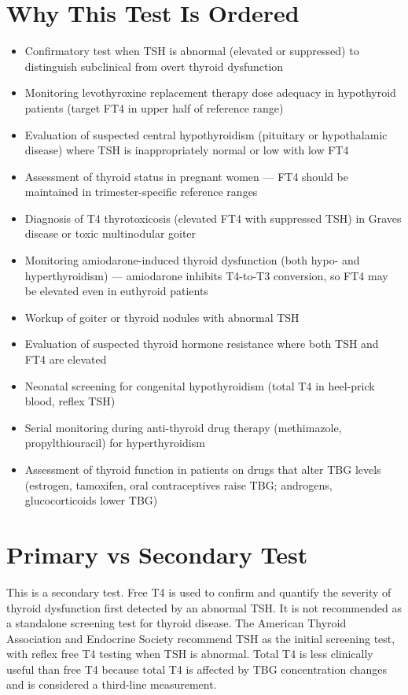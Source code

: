 \section*{Why This Test Is Ordered}
\begin{itemize}
  \item Confirmatory test when TSH is abnormal (elevated or suppressed) to distinguish subclinical from overt thyroid dysfunction
  \item Monitoring levothyroxine replacement therapy dose adequacy in hypothyroid patients (target FT4 in upper half of reference range)
  \item Evaluation of suspected central hypothyroidism (pituitary or hypothalamic disease) where TSH is inappropriately normal or low with low FT4
  \item Assessment of thyroid status in pregnant women --- FT4 should be maintained in trimester-specific reference ranges
  \item Diagnosis of T4 thyrotoxicosis (elevated FT4 with suppressed TSH) in Graves disease or toxic multinodular goiter
  \item Monitoring amiodarone-induced thyroid dysfunction (both hypo- and hyperthyroidism) --- amiodarone inhibits T4-to-T3 conversion, so FT4 may be elevated even in euthyroid patients
  \item Workup of goiter or thyroid nodules with abnormal TSH
  \item Evaluation of suspected thyroid hormone resistance where both TSH and FT4 are elevated
  \item Neonatal screening for congenital hypothyroidism (total T4 in heel-prick blood, reflex TSH)
  \item Serial monitoring during anti-thyroid drug therapy (methimazole, propylthiouracil) for hyperthyroidism
  \item Assessment of thyroid function in patients on drugs that alter TBG levels (estrogen, tamoxifen, oral contraceptives raise TBG; androgens, glucocorticoids lower TBG)
\end{itemize}

\section*{Primary vs Secondary Test}
This is a secondary test. Free T4 is used to confirm and quantify the severity of thyroid dysfunction first detected by an abnormal TSH. It is not recommended as a standalone screening test for thyroid disease. The American Thyroid Association and Endocrine Society recommend TSH as the initial screening test, with reflex free T4 testing when TSH is abnormal. Total T4 is less clinically useful than free T4 because total T4 is affected by TBG concentration changes and is considered a third-line measurement.

